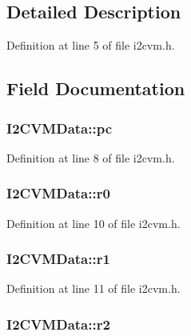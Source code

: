 \subsection{Detailed Description}


Definition at line 5 of file i2cvm.\-h.



\subsection{Field Documentation}
\hypertarget{struct_i2_c_v_m_data_ab06e5a47a14e65556c2560ee7dce6e80}{
\subsubsection[{pc}]{ I2\-C\-V\-M\-Data\-::pc}}\label{struct_i2_c_v_m_data_ab06e5a47a14e65556c2560ee7dce6e80}


Definition at line 8 of file i2cvm.\-h.

\hypertarget{struct_i2_c_v_m_data_a57f3e029983539b73d8e3003fdb6dc4a}{
\subsubsection[{r0}]{ I2\-C\-V\-M\-Data\-::r0}}\label{struct_i2_c_v_m_data_a57f3e029983539b73d8e3003fdb6dc4a}


Definition at line 10 of file i2cvm.\-h.

\hypertarget{struct_i2_c_v_m_data_ae2818ce904b068618235b51a6c6d7e40}{
\subsubsection[{r1}]{ I2\-C\-V\-M\-Data\-::r1}}\label{struct_i2_c_v_m_data_ae2818ce904b068618235b51a6c6d7e40}


Definition at line 11 of file i2cvm.\-h.

\hypertarget{struct_i2_c_v_m_data_abd3898745367cbba7a19f3c0a5f47afc}{
\subsubsection[{r2}]{ I2\-C\-V\-M\-Data\-::r2}}\label{struct_i2_c_v_m_data_abd3898745367cbba7a19f3c0a5f47afc}


